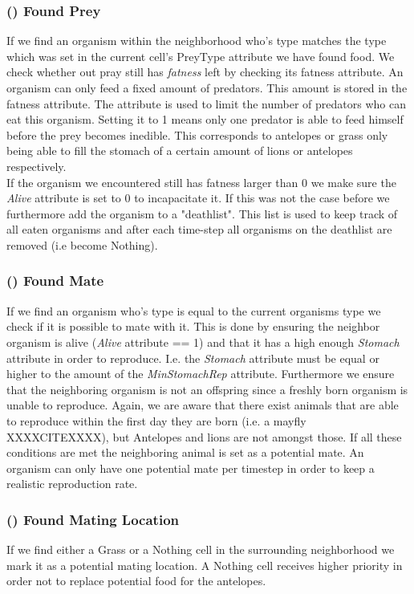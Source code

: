 \documentclass[11pt]{article}
\begin{document}
\subsubsection{() Found Prey}
If we find an organism within the neighborhood who's type matches the type which was set in the current cell's PreyType attribute we have found food. We check whether out pray still has {\it fatness} left by checking its fatness attribute. An organism can only feed a fixed amount of predators. This amount is stored in the fatness attribute. The attribute is used to limit the number of predators who can eat this organism. Setting it to 1 means only one predator is able to feed himself before the prey becomes inedible. This corresponds to antelopes or grass only being able to fill the stomach of a certain amount of lions or antelopes respectively.\\
If the organism we encountered still has fatness larger than 0 we make sure the {\it Alive} attribute is set to 0 to incapacitate it. If this was not the case before we furthermore add the organism to a "deathlist". This list is used to keep track of all eaten organisms and after each time-step all organisms on the deathlist are removed (i.e become Nothing). 

\addtocounter{protocolCounter}{1}
\subsubsection{() Found Mate}
If we find an organism who's type is equal to the current organisms type we check if it is possible to mate with it. This is done by ensuring the neighbor organism is alive ({\it Alive} attribute == 1) and that it has a high enough {\it Stomach} attribute in order to reproduce. I.e. the {\it Stomach} attribute must be equal or higher to the amount of the {\it MinStomachRep} attribute. Furthermore we ensure that the neighboring organism is not an offspring since a freshly born organism is unable to reproduce. Again, we are aware that there exist animals that are able to reproduce within the first day they are born (i.e. a mayfly XXXXCITEXXXX), but Antelopes and lions are not amongst those. If all these conditions are met the neighboring animal is set as a potential mate. An organism can only have one potential mate per timestep in order to keep a realistic reproduction rate.

\addtocounter{protocolCounter}{1}
\subsubsection{() Found Mating Location}
If we find either a Grass or a Nothing cell in the surrounding neighborhood we mark it as a potential mating location. A Nothing cell receives higher priority in order not to replace potential food for the antelopes. 
\end{document}
